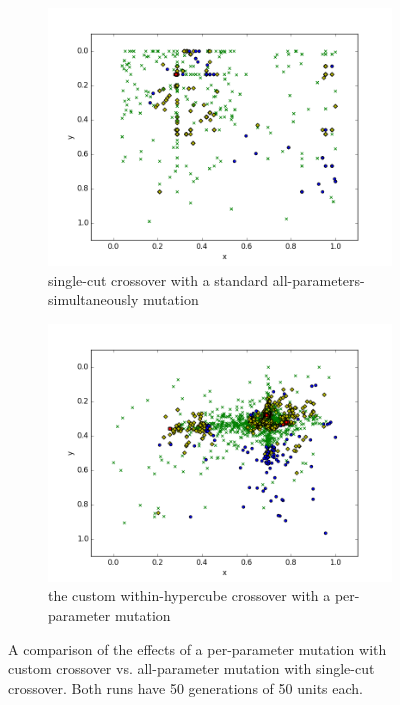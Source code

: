 \documentclass[times, utf8, diplomski]{fer}
\begin{document}
\begin{figure}[htp]
    \vspace{-50pt}      %
    \centering
    \begin{subfigure}[b]{\textwidth}
        \includegraphics[width=\textwidth]{images/mutation_crossover_effect_comparison_traditional.png}
        \caption{single-cut crossover with a standard all-parameters-simultaneously mutation}
    \end{subfigure}

    \begin{subfigure}[b]{\textwidth}
        \includegraphics[width=\textwidth]{images/mutation_crossover_effect_comparison_myalgo.png}
        \caption{the custom within-hypercube crossover with a per-parameter mutation}
    \end{subfigure}
    \caption{A comparison of the effects of a per-parameter mutation with custom
             crossover vs. all-parameter mutation with single-cut crossover. Both
             runs have 50 generations of 50 units each.
    }
    \label{fig:weaker_effect}
\end{figure}
\end{document}
